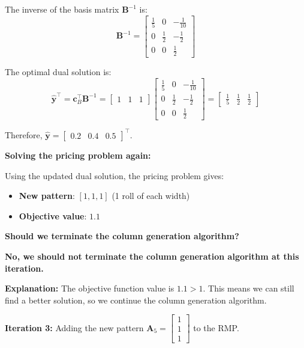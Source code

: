 \documentclass[11pt]{article}
\newcommand{\mb}[1]{\ensuremath{\boldsymbol{#1}}}
\begin{document}
\begin{enumerate}
\begin{enumerate}
The inverse of the basis matrix $\mb{B}^{-1}$ is:
$$\mb{B}^{-1} = \begin{bmatrix} \frac{1}{5} & 0 & -\frac{1}{10} \\ 0 & \frac{1}{2} & -\frac{1}{2} \\ 0 & 0 & \frac{1}{2} \end{bmatrix}$$

The optimal dual solution is:
$$\hat{\mb{y}}^\top = \mb{c}_B^\top\mb{B}^{-1} = \begin{bmatrix} 1 & 1 & 1 \end{bmatrix} \begin{bmatrix} \frac{1}{5} & 0 & -\frac{1}{10} \\ 0 & \frac{1}{2} & -\frac{1}{2} \\ 0 & 0 & \frac{1}{2} \end{bmatrix} = \begin{bmatrix} \frac{1}{5} & \frac{1}{2} & \frac{1}{2} \end{bmatrix}$$

Therefore, $\hat{\mb{y}} = \begin{bmatrix} 0.2 & 0.4 & 0.5 \end{bmatrix}^\top$.

\textbf{Solving the pricing problem again:}

Using the updated dual solution, the pricing problem gives:
\begin{itemize}
\item \textbf{New pattern}: $[1, 1, 1]$ (1 roll of each width)
\item \textbf{Objective value}: $1.1$
\end{itemize}

\textbf{Should we terminate the column generation algorithm?}

\textbf{No, we should not terminate the column generation algorithm at this iteration.}

\textbf{Explanation:} The objective function value is $1.1 > 1$. This means we can still find a better solution, so we continue the column generation algorithm.

\textbf{Iteration 3:} Adding the new pattern $\mb{A}_5 = \begin{bmatrix} 1 \\ 1 \\ 1 \end{bmatrix}$ to the RMP.


\end{enumerate}
\end{enumerate}
\end{document}
